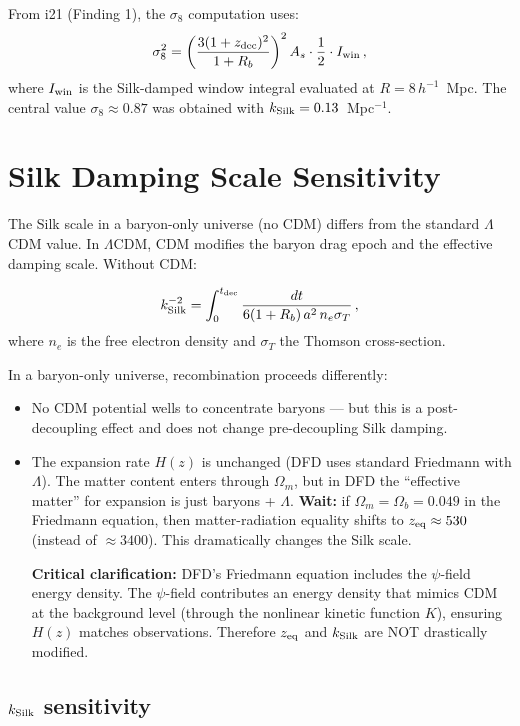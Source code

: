 \documentclass[11pt]{article}
\newcommand{\LCDM}{$\Lambda$CDM}
\newcommand{\kSilk}{k_{\rm Silk}}
\newcommand{\Ob}{\Omega_b}
\newcommand{\Om}{\Omega_m}
\begin{document}
From i21 (Finding 1), the $\sigma_8$ computation uses:
\begin{equation}
\sigma_8^2 = \left(\frac{3(1+z_{\rm dec})^2}{1+R_b}\right)^2
A_s\cdot\frac{1}{2}\cdot I_{\rm win}\,,
\end{equation}
where $I_{\rm win}$ is the Silk-damped window integral evaluated at
$R = 8\,h^{-1}$~Mpc.  The central value $\sigma_8 \approx 0.87$ was
obtained with $\kSilk = 0.13$~Mpc$^{-1}$.

\section{Silk Damping Scale Sensitivity}

The Silk scale in a baryon-only universe (no CDM) differs from the
standard \LCDM{} value.  In \LCDM, CDM modifies the baryon drag epoch
and the effective damping scale.  Without CDM:

\begin{equation}
\kSilk^{-2} = \int_0^{t_{\rm dec}}\frac{dt}{6(1+R_b)\,a^2\,n_e\sigma_T}\,,
\end{equation}
where $n_e$ is the free electron density and $\sigma_T$ the Thomson
cross-section.

In a baryon-only universe, recombination proceeds differently:
\begin{itemize}
\item No CDM potential wells to concentrate baryons --- but this is a
  post-decoupling effect and does not change pre-decoupling Silk damping.
\item The expansion rate $H(z)$ is unchanged (DFD uses standard Friedmann
  with $\Lambda$).  The matter content enters through $\Om$, but in DFD
  the ``effective matter'' for expansion is just baryons + $\Lambda$.
  \textbf{Wait:} if $\Om = \Ob = 0.049$ in the Friedmann equation, then
  matter-radiation equality shifts to $z_{\rm eq} \approx 530$ (instead of
  $\approx 3400$).  This dramatically changes the Silk scale.

  \textbf{Critical clarification:} DFD's Friedmann equation includes
  the $\psi$-field energy density.  The $\psi$-field contributes an
  energy density that mimics CDM at the background level (through the
  nonlinear kinetic function $K$), ensuring $H(z)$ matches observations.
  Therefore $z_{\rm eq}$ and $\kSilk$ are NOT drastically modified.
\end{itemize}

\subsection{$\kSilk$ sensitivity}
\end{document}
